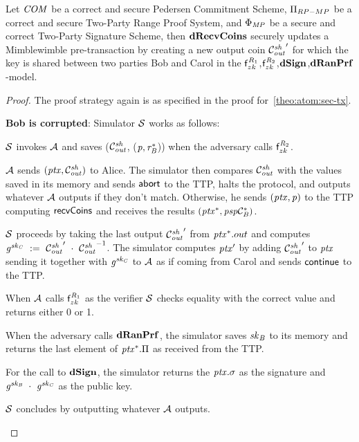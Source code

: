 \begin{theorem}
    \label{teo:atom:sec-drecv}
    Let $\mathit{COM}$ be a correct and secure Pedersen Commitment Scheme, $\Pi_{RP-MP}$ be a correct and secure Two-Party Range Proof System, and $\Phi_{\mathit{MP}}$ be a secure and correct Two-Party Signature Scheme, then $\mathbf{dRecvCoins}$ securely updates a Mimblewimble pre-transaction by creating a new output coin ${\mathcal{C}_{\mathit{out}}^{\mathit{sh}}}'$ for which the key is shared between two parties Bob and Carol in the $\mathsf{f}^{\mathit{R}_1}_{zk}$,$\mathsf{f}^{\mathit{R}_2}_{zk}$,$\mathbf{dSign}$,$\mathbf{dRanPrf}$-model.
\end{theorem}

\begin{proof}
    The proof strategy again is as specified in the proof for~\cref{theo:atom:sec-tx}.

    \textbf{Bob is corrupted}: Simulator $\mathcal{S}$ works as follows:
    \begin{asparaenum}
        \item $\mathcal{S}$ invokes $\mathcal{A}$ and saves ($\mathcal{C}_{\mathit{out}}^{\mathit{sh}}$, ($\mathit{p}, \mathit{r}_{\mathit{B}}^*$)) when the adversary calls $\mathsf{f}^{\mathit{R}_2}_{zk}$.
        \item $\mathcal{A}$ sends $(\mathit{ptx},\mathcal{C}_{\mathit{out}}^{\mathit{sh}})$ to Alice.
        The simulator then compares $\mathcal{C}_{\mathit{out}}^{\mathit{sh}}$ with the values saved in its memory and sends $\mathsf{abort}$ to the TTP, halts the protocol, and outputs whatever $\mathcal{A}$ outputs if they don't match.
        Otherwise, he sends $(\mathit{ptx}, \mathit{p})$ to the TTP computing $\mathsf{recvCoins}$ and receives the results $(\mathit{ptx}^*, \mathit{psp}\mathcal{C}_{\mathit{B}}^*)$.
        \item $\mathcal{S}$ proceeds by taking the last output ${\mathcal{C}_{\mathit{out}}^{\mathit{sh}}}'$ from $\mathit{ptx}^*.out$ and computes $\mathit{g}^{\mathit{sk}_{\mathit{C}}} ~:=~ {\mathcal{C}_{\mathit{out}}^{\mathit{sh}}}' ~\cdot~ {\mathcal{C}_{\mathit{out}}^{\mathit{sh}}}^{-1}$.
        The simulator computes ${\mathit{ptx}}'$ by adding ${\mathcal{C}_{\mathit{out}}^{\mathit{sh}}}'$ to $\mathit{ptx}$ sending it together with $\mathit{g}^{\mathit{sk}_{\mathit{C}}}$ to $\mathcal{A}$ as if coming from Carol and sends $\mathsf{continue}$ to the TTP.
        \item When $\mathcal{A}$ calls $\mathsf{f}^{\mathit{R}_1}_{zk}$ as the verifier $\mathcal{S}$ checks equality with the correct value and returns either 0 or 1.
        \item When the adversary calls $\mathbf{dRanPrf}$, the simulator saves $\mathit{sk}_{\mathit{B}}$ to its memory and returns the last element of $\mathit{ptx}^*.\Pi$ as received from the TTP.
        \item For the call to $\mathbf{dSign}$, the simulator returns the $\mathit{ptx}.\sigma$ as the signature and $\mathit{g}^{\mathit{sk}_{\mathit{B}}} ~\cdot~ \mathit{g}^{\mathit{sk}_{\mathit{C}}}$ as the public key.
        \item $\mathcal{S}$ concludes by outputting whatever $\mathcal{A}$ outputs.
    \end{asparaenum}


\end{proof}
